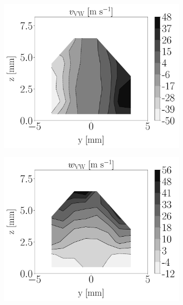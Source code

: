 \begin{figure}[h!]
\begin{subfigure}[b]{0.2\textwidth}
\end{subfigure}
\hspace*{0.45in}
\begin{subfigure}[b]{0.2\textwidth}
	\flushleft
   \includegraphics[scale=0.19]{./part2_developments/figures_ch6_lagrangian_JICF/injectors_SLI/uG100_dx10_x05_uy_mean_vw_map}
\end{subfigure}
\hspace*{0.45in}
\begin{subfigure}[b]{0.2\textwidth}
	\flushleft
   \includegraphics[scale=0.19]{./part2_developments/figures_ch6_lagrangian_JICF/injectors_SLI/uG100_dx10_x05_uz_mean_vw_map}
\end{subfigure}


\end{figure}
